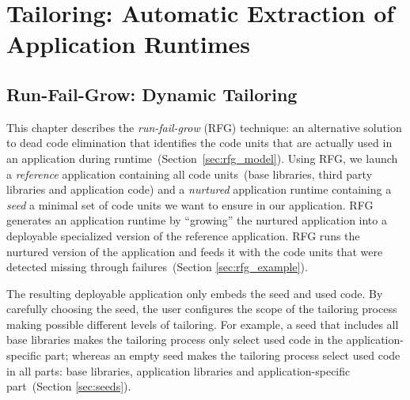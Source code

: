 
\part{Tailoring: Automatic Extraction of Application Runtimes}
\chapter{Run-Fail-Grow: Dynamic Tailoring}
\minitoc
\introduction



This chapter describes the \emph{run-fail-grow} (RFG) technique: an alternative solution to dead code elimination that identifies the code units that are actually used in an application during runtime~(Section~\ref{sec:rfg_model}).
Using RFG, we launch a \emph{reference} application containing all code units~(base libraries, third party libraries and application code) and a \emph{nurtured} application runtime containing a \emph{seed} \ie a minimal set of code units we want to ensure in our application.
RFG generates an application runtime by ``growing'' the nurtured application into a deployable specialized version of the reference application. 
RFG runs the nurtured version of the application and feeds it with the code units that were detected missing through failures~(Section \ref{sec:rfg_example}).

The resulting deployable application only embeds the seed and used code.
By carefully choosing the seed, the user configures the scope of the tailoring process making possible different levels of tailoring.
For example, a seed that includes all base libraries makes the tailoring process only select used code in the application-specific part; whereas an empty seed makes the tailoring process select used code in all parts: base libraries, application libraries and application-specific part~(Section \ref{sec:seeds}).

